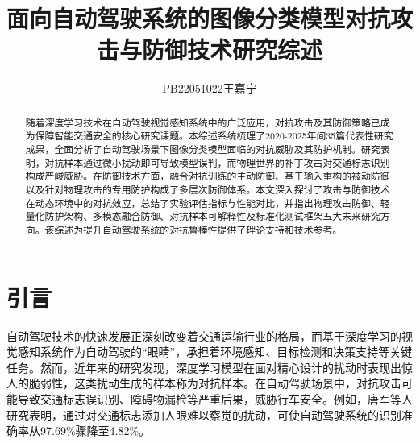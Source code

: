 \documentclass[acmtog]{ctexart}
\begin{document}
\title{面向自动驾驶系统的图像分类模型对抗攻击与防御技术研究综述}

\author{PB22051022王嘉宁}

\begin{abstract}
  随着深度学习技术在自动驾驶视觉感知系统中的广泛应用，对抗攻击及其防御策略已成为保障智能交通安全的核心研究课题。本综述系统梳理了2020-2025年间35篇代表性研究成果，全面分析了自动驾驶场景下图像分类模型面临的对抗威胁及其防护机制。研究表明，对抗样本通过微小扰动即可导致模型误判，而物理世界的补丁攻击对交通标志识别构成严峻威胁。在防御技术方面，融合对抗训练的主动防御、基于输入重构的被动防御以及针对物理攻击的专用防护构成了多层次防御体系。本文深入探讨了攻击与防御技术在动态环境中的对抗效应，总结了实验评估指标与性能对比，并指出物理攻击防御、轻量化防护架构、多模态融合防御、对抗样本可解释性及标准化测试框架五大未来研究方向。该综述为提升自动驾驶系统的对抗鲁棒性提供了理论支持和技术参考。
\end{abstract}




\maketitle

\section{引言}
自动驾驶技术的快速发展正深刻改变着交通运输行业的格局，而基于深度学习的视觉感知系统作为自动驾驶的“眼睛”，承担着环境感知、目标检测和决策支持等关键任务。然而，近年来的研究发现，深度学习模型在面对精心设计的扰动时表现出惊人的脆弱性，这类扰动生成的样本称为对抗样本。在自动驾驶场景中，对抗攻击可能导致交通标志误识别、障碍物漏检等严重后果，威胁行车安全。例如，唐军等人研究表明，通过对交通标志添加人眼难以察觉的扰动，可使自动驾驶系统的识别准确率从97.69\%骤降至4.82\%。
\end{document}
